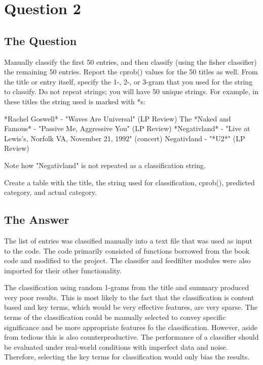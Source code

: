 \section{Question 2}

\subsection{The Question}

\begin{flushleft}

Manually classify the first 50 entries, and then classify (using
the fisher classifier) the remaining 50 entries. Report the cprob()
values for the 50 titles as well.  From the title or entry itself,
specify the 1-, 2-, or 3-gram that you used for the string to
classify.  Do not repeat strings; you will have 50 unique strings.
For example, in these titles the string used is marked with *s:

*Rachel Goswell* - "Waves Are Universal" (LP Review) 
The *Naked and Famous* - "Passive Me, Aggressive You" (LP Review)
*Negativland* - "Live at Lewis's, Norfolk VA, November 21, 1992" (concert)
Negativland - "*U2*" (LP Review)

Note how "Negativland" is not repeated as a classification string.

Create a table with the title, the string used for classification,
cprob(), predicted category, and actual category.

\end{flushleft}
\subsection{The Answer}

The list of entries was classified manually into a text file that was used as input to the code. The code primarily consisted of functions borrowed from the book code and modified to the project. The classifer and feedfilter modules were also imported for their other functionality.




The classification using random 1-grams from the title and summary produced very poor results. This is most likely to the fact that the classification is content based and key terms, which would be very effective features, are very sparse. The terms of the classification could be manually selected to convey specific significance and be more appropriate features fo the classification. However, aside from tedious this is also counterproductive. The performance of a classifier should be evaluated under real-world conditions with imperfect data and noise. Therefore, selecting the key terms for classification would only bias the results.

